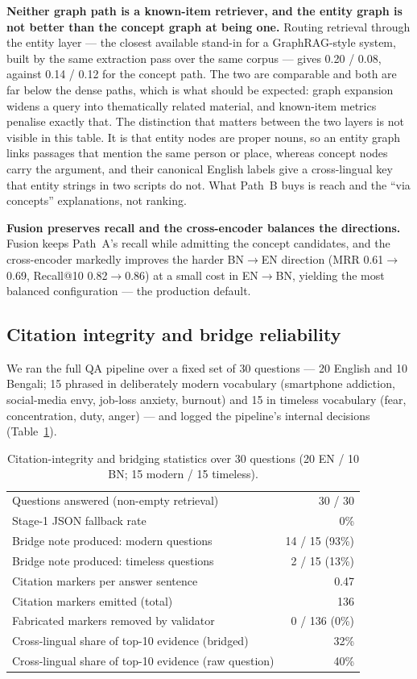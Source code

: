 \documentclass[pdflatex,sn-mathphys-num]{sn-jnl}
\begin{document}
\textbf{Neither graph path is a known-item retriever, and the entity graph
is not better than the concept graph at being one.} Routing retrieval
through the entity layer --- the closest available stand-in for a
GraphRAG-style system, built by the same extraction pass over the same
corpus --- gives 0.20 / 0.08, against 0.14 / 0.12 for the concept path. The
two are comparable and both are far below the dense paths, which is what
should be expected: graph expansion widens a query into thematically
related material, and known-item metrics penalise exactly that. The
distinction that matters between the two layers is not visible in this
table. It is that entity nodes are proper nouns, so an entity graph links
passages that mention the same person or place, whereas concept nodes carry
the argument, and their canonical English labels give a cross-lingual key
that entity strings in two scripts do not. What Path~B buys is reach and
the ``via concepts'' explanations, not ranking.

\textbf{Fusion preserves recall and the cross-encoder balances the
directions.} Fusion keeps Path~A's recall while admitting the concept
candidates, and the cross-encoder markedly improves the harder BN$\to$EN
direction (MRR 0.61$\to$0.69, Recall@10 0.82$\to$0.86) at a small cost in
EN$\to$BN, yielding the most balanced configuration --- the production
default.

\subsection{Citation integrity and bridge reliability}
\label{sec:eval-integrity}

We ran the full QA pipeline over a fixed set of 30 questions --- 20
English and 10 Bengali; 15 phrased in deliberately modern vocabulary
(smartphone addiction, social-media envy, job-loss anxiety, burnout) and
15 in timeless vocabulary (fear, concentration, duty, anger) --- and
logged the pipeline's internal decisions (Table~\ref{tab:integrity}).

\begin{table}[t]
\centering
\caption{Citation-integrity and bridging statistics over 30 questions
(20 EN / 10 BN; 15 modern / 15 timeless).}
\label{tab:integrity}
\begin{tabular}{lr}
\toprule
Questions answered (non-empty retrieval) & 30 / 30\\
Stage-1 JSON fallback rate & 0\%\\
Bridge note produced: modern questions & 14 / 15 (93\%)\\
Bridge note produced: timeless questions & 2 / 15 (13\%)\\
Citation markers per answer sentence & 0.47\\
Citation markers emitted (total) & 136\\
Fabricated markers removed by validator & 0 / 136 (0\%)\\
Cross-lingual share of top-10 evidence (bridged) & 32\%\\
Cross-lingual share of top-10 evidence (raw question) & 40\%\\
\bottomrule
\end{tabular}
\end{table}
\end{document}
